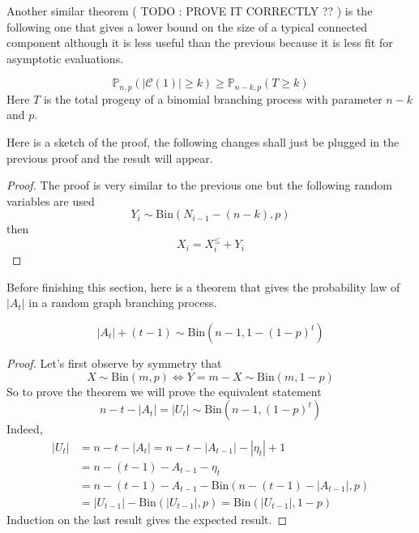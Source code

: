 Another similar theorem ( TODO : PROVE IT CORRECTLY  ?? ) is the following one that gives a lower bound on the size of a typical connected component although it is less useful than the previous because it is less fit for asymptotic evaluations.

\begin{theorem}\label{th:lowbin}
	\begin{equation}
		\mathbb{P}_{n,p}(|\mathcal{C}(1)| \geq k) \geq \mathbb{P}_{n-k,p}(T\geq k)
	\end{equation}
	Here $T$ is the total progeny of a binomial branching process with parameter $n-k$ and $p$.
\end{theorem}
Here is a sketch of the proof, the following changes shall just be plugged in the previous proof and the result will appear.
\begin{proof}
	The proof is very similar to the previous one but the following random variables are used
	\begin{equation}
		Y_i \sim \text{Bin}(N_{i-1} - (n-k), p)
	\end{equation}
	then 
	\begin{equation}
		X_i = X_i^{\leq}+Y_i
	\end{equation}
\end{proof}
Before finishing this section, here is a theorem that gives the probability law of $|A_t|$ in a random graph branching process.
\begin{theorem}\label{th:Atlaw}
	\begin{equation}
		|A_t| + (t-1) \sim \text{Bin}(n-1, 1 - (1-p)^t)
	\end{equation}
\end{theorem}
\begin{proof}
	Let's first observe by symmetry that 
	\begin{equation}
		X \sim \text{Bin}(m, p) \iff Y = m-X \sim \text{Bin}(m, 1-p)
	\end{equation}
	So to prove the theorem we will prove the equivalent statement
	\begin{equation}
		n-t-|A_t| = |U_t| \sim \text{Bin}(n-1, (1-p)^t)
	\end{equation}
	Indeed, 
	\begin{align}
		|U_t| &= n - t - |A_t| = n - t - |A_{t-1}| - |\eta_t| + 1 \\
		      &= n - (t-1) - A_{t-1} -\eta_t \\
		      &= n - (t-1) - A_{t-1} - \text{Bin}(n-(t-1)-|A_{t-1}|, p)\\
		      &=|U_{t-1}| - \text{Bin}(|U_{t-1}|, p) = \text{Bin}(|U_{t-1}|, 1-p)
	\end{align}
	Induction on the last result gives the expected result.
\end{proof}

